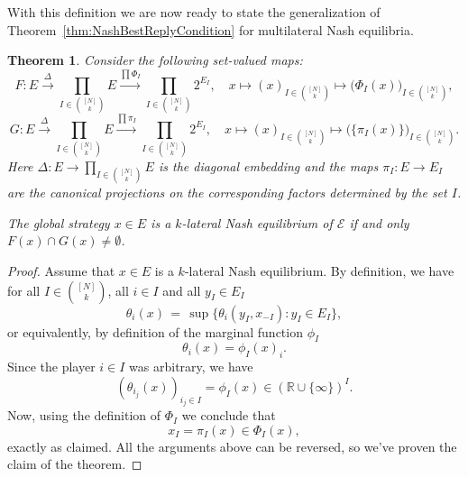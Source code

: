 \documentclass[a4paper,11pt,reqno,english]{amsart}
\theoremstyle{plain}
\newtheorem{theorem}{Theorem}[section]
\theoremstyle{definition}
\newcommand{\Ecal}{\mathcal{E}}
\begin{document}
\medskip
With this definition we are now ready to state the generalization of Theorem~\ref{thm:NashBestReplyCondition} for multilateral Nash equilibria.

\begin{theorem}\label{thm:BestReplyConditionMultilateralNash}
	Consider the following set-valued maps:
	\begin{displaymath}
		F \colon E\xrightarrow{\Delta} \prod_{I\in\binom{[N]}{k}}E \xrightarrow{\prod \Phi_I} \prod_{I\in\binom{[N]}{k}} 2^{E_I}, \quad x\longmapsto (x)_{I\in\binom{[N]}{k}} \longmapsto \big(\Phi_I(x)\big)_{I\in\binom{[N]}{k}},
	\end{displaymath}
	\begin{displaymath}
		G \colon E\xrightarrow{\Delta} \prod_{I\in\binom{[N]}{k}}E \xrightarrow{\prod \pi_I} \prod_{I\in\binom{[N]}{k}} 2^{E_I}, \quad x\longmapsto (x)_{I\in\binom{[N]}{k}} \longmapsto \big(\{\pi_I(x)\}\big)_{I\in\binom{[N]}{k}}.
	\end{displaymath}
	Here $\Delta\colon E\longrightarrow \prod_{I\in\binom{[N]}{k}} E$ is the diagonal embedding and the maps $\pi_I\colon E\longrightarrow E_I$ are the canonical projections on the corresponding factors determined by the set $I$.

	\smallskip\noindent
	The global strategy $x\in E$ is a $k$-lateral Nash equilibrium of $\Ecal$ if and only $F(x)\cap G(x)\neq \emptyset$.
\end{theorem}

\begin{proof}
	Assume that $x\in E$ is a $k$-lateral Nash equilibrium. 
	By definition, we have for all $I\in\binom{[N]}{k}$, all $i\in I$ and all $y_I\in E_I$
	\begin{displaymath}
		\theta_i(x) \, = \, \sup\Big\{ \theta_i(y_I, x_{-I}) : y_I\in E_I \Big\},
	\end{displaymath}
	or equivalently, by definition of the marginal function $\phi_I$
	\begin{displaymath}
		\theta_i(x) = \phi_I(x)_i.
	\end{displaymath}
	Since the player $i\in I$ was arbitrary, we have
	\begin{displaymath}
		(\theta_{i_j}(x))_{i_j\in I} = \phi_I(x) \in (\mathbb{R}\cup\{\infty\})^{I}.
	\end{displaymath}
	Now, using the definition of $\Phi_I$ we conclude that
	\begin{displaymath}
		x_I = \pi_I(x)\in \Phi_I(x),
	\end{displaymath}
	exactly as claimed. All the arguments above can be reversed, so we've proven the claim of the theorem.
\end{proof}
\end{document}
